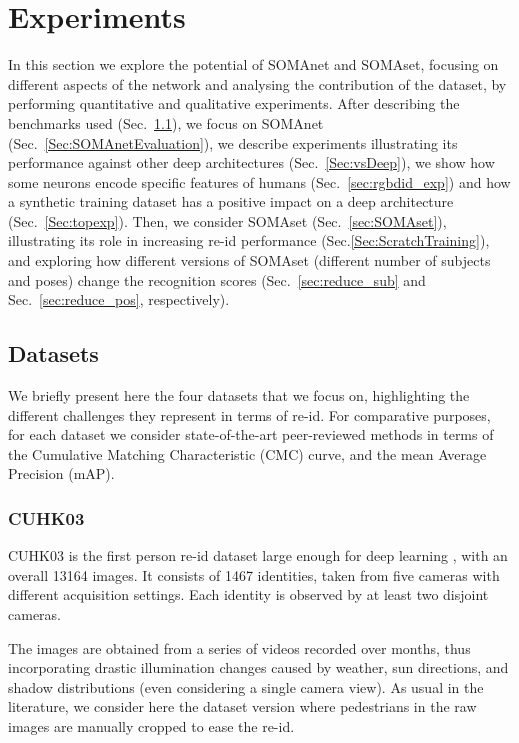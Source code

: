 \documentclass[10pt,journal,letterpaper,compsoc]{IEEEtran}
\begin{document}
\section{Experiments}
\label{Experiments}
In this section we explore the potential of SOMAnet and SOMAset, focusing on different aspects of the network and analysing the contribution of the dataset, by performing quantitative and qualitative experiments.
After describing the benchmarks used (Sec.~\ref{Sec:dataset}), we focus on SOMAnet (Sec.~\ref{Sec:SOMAnetEvaluation}), we describe experiments illustrating its performance against other deep architectures (Sec.~\ref{Sec:vsDeep}), we show how some neurons encode specific features of humans (Sec.~\ref{sec:rgbdid_exp}) and how a synthetic training dataset has a positive impact on a deep architecture (Sec.~\ref{Sec:topexp}). Then, we consider SOMAset (Sec.~\ref{sec:SOMAset}), illustrating its role in increasing re-id performance (Sec.\ref{Sec:ScratchTraining}), and exploring how different versions of SOMAset (different number of subjects and poses) change the recognition scores (Sec.~\ref{sec:reduce_sub} and Sec.~\ref{sec:reduce_pos}, respectively).





\subsection{Datasets}\label{Sec:dataset}
We briefly present here the four datasets that we focus on, highlighting the different challenges they represent in terms of re-id.
For comparative purposes, for each dataset we consider state-of-the-art peer-reviewed methods in terms of the Cumulative Matching Characteristic (CMC) curve, and the mean Average Precision (mAP).

\subsubsection{CUHK03}
CUHK03 is the first person re-id dataset large enough for deep learning \cite{li2014deepreid}, with an overall 13164 images. It consists of 1467 identities, taken from five cameras with different acquisition settings. Each identity is observed by at least two disjoint cameras.


The images are obtained from a series of videos recorded over months, thus incorporating drastic illumination changes caused by weather, sun directions, and shadow distributions (even considering a single camera view). As usual in the literature, we consider here the dataset version where pedestrians in the raw images are manually cropped to ease the re-id.
\end{document}
